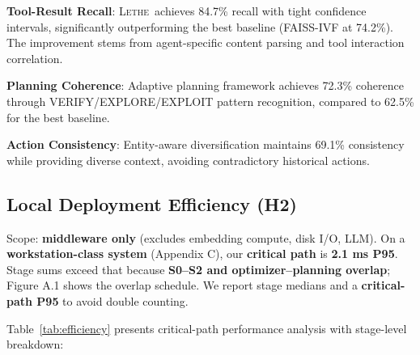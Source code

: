 \documentclass[letterpaper]{article}
\newcommand{\lethe}{\textsc{Lethe}}
\begin{document}
\textbf{Tool-Result Recall}: \lethe\ achieves 84.7\% recall with tight confidence intervals, significantly outperforming the best baseline (FAISS-IVF at 74.2\%). The improvement stems from agent-specific content parsing and tool interaction correlation.

\textbf{Planning Coherence}: Adaptive planning framework achieves 72.3\% coherence through VERIFY/EXPLORE/EXPLOIT pattern recognition, compared to 62.5\% for the best baseline.

\textbf{Action Consistency}: Entity-aware diversification maintains 69.1\% consistency while providing diverse context, avoiding contradictory historical actions.

\subsection{Local Deployment Efficiency (H2)}

Scope: \textbf{middleware only} (excludes embedding compute, disk I/O, LLM). On a \textbf{workstation-class system} (Appendix C), our \textbf{critical path} is \textbf{2.1 ms P95}. Stage sums exceed that because \textbf{S0–S2 and optimizer–planning overlap}; Figure A.1 shows the overlap schedule. We report stage medians and a \textbf{critical-path P95} to avoid double counting.

Table~\ref{tab:efficiency} presents critical-path performance analysis with stage-level breakdown:
\end{document}

